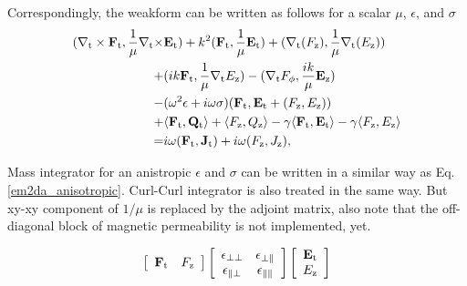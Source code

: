 \documentclass[11pt,a4paper,final]{report}
\begin{document}
Correspondingly, the weakform can be written as follows for a scalar $\mu$, $\epsilon$,  and $\sigma$
\begin{align}
(\nabla_{\rm t} \times \mathbf{F}_{\rm t},  \frac{1}{\mu}\nabla_{\rm t}  \times & \mathbf{E}_{\rm t}) 
+  k^2(\mathbf{F}_{\rm t}, \frac{1}{\mu}\mathbf{E}_{\rm t})
+ (\nabla_{\rm t} (F_{\rm z}), \frac{1}{\mu}\nabla_{\rm t} (E_{\rm z}))
 \notag \\
+& (ik \mathbf{F}_{\rm t}, \frac{1}{\mu}\nabla_{\rm t} E_{\rm z})
- (\nabla_{\rm t} F_{\rm \phi}, \frac{ik}{\mu} \mathbf{E}_{\rm z})
 \notag \\
 -& (\omega^2 \epsilon+ i \omega \sigma) (  \mathbf{F}_{\rm t}, \mathbf{E}_{\rm t} + (F_{\rm z}, E_{\rm z})) 
 \notag \\
 +& \langle \mathbf{F}_{\rm t},  \mathbf{Q}_{\rm t} \rangle + \langle F_{\rm z}, Q_{\rm z} \rangle 
 - \gamma \langle \mathbf{F}_{\rm t}, \mathbf{E}_{\rm t} \rangle
 - \gamma \langle F_{\rm z}, E_{\rm z} \rangle
 \notag \\
 =& i \omega ( \mathbf{F}_{\rm t}, \mathbf{J}_{\rm t} ) + i \omega ( F_{\rm z}, J_{\rm z} ), \label{em2d_weak}
 \end{align}

Mass integrator for an anistropic $\epsilon$ and $\sigma$ can be written in a similar way as Eq.\,\ref{em2da_anisotropic}. 
Curl-Curl integrator is also treated in the same way. But xy-xy component of $1/\mu$ is replaced by the adjoint matrix, also note
that the off-diagonal block of magnetic permeability is not implemented, yet. 

 \begin{equation}
 \left[ {\begin{array}{*{20}c}
\mathbf{F}_{\rm t}  & F_{\rm z}\\
\end{array}}\right]
\left[ {\begin{array}{*{20}c}
\mathbf{\epsilon}_{\perp \perp}  & \mathbf{\epsilon}_{\perp \parallel}\\
\mathbf{\epsilon}_{\parallel \perp} & \mathbf{\epsilon}_{\parallel \parallel}\\
\end{array}}\right]
 \left[ {\begin{array}{*{20}c}
\mathbf{E}_{\rm t}  \\
E_{\rm z}\\
\end{array}}\right]
\label{em2d_anisotropic}
\end{equation}
\end{document}
